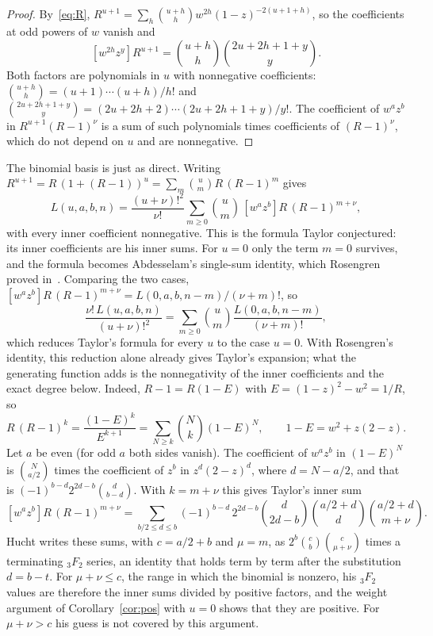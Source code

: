 \documentclass[11pt]{amsart}
\theoremstyle{remark}
\newcommand{\coef}[1]{[#1]}
\begin{document}
\begin{proof}
By~\eqref{eq:R}, $R^{u+1}=\sum_h\binom{u+h}h w^{2h}(1-z)^{-2(u+1+h)}$, so the coefficients at odd powers of $w$ vanish and
\begin{equation}\label{eq:Rpow}
 \coef{w^{2h}z^y}R^{u+1}=\binom{u+h}h\binom{2u+2h+1+y}y.
\end{equation}
Both factors are polynomials in $u$ with nonnegative coefficients: $\binom{u+h}h=(u+1)\cdots(u+h)/h!$ and $\binom{2u+2h+1+y}y=(2u+2h+2)\cdots(2u+2h+1+y)/y!$. The coefficient of $w^az^b$ in $R^{u+1}(R-1)^\nu$ is a sum of such polynomials times coefficients of $(R-1)^\nu$, which do not depend on $u$ and are nonnegative.
\end{proof}

The binomial basis is just as direct. Writing $R^{u+1}=R\,(1+(R-1))^u=\sum_m\binom um R\,(R-1)^m$ gives
\[
 L(u,a,b,n)=\frac{(u+\nu)!^2}{\nu!}\sum_{m\ge0}\binom um\,\coef{w^az^b}R\,(R-1)^{m+\nu},
\]
with every inner coefficient nonnegative. This is the formula Taylor conjectured: its inner coefficients are his inner sums. For $u=0$ only the term $m=0$ survives, and the formula becomes Abdesselam's single-sum identity, which Rosengren proved in~\cite{MO2}. Comparing the two cases, $\coef{w^az^b}R\,(R-1)^{m+\nu}=L(0,a,b,n-m)/(\nu+m)!$, so
\[
 \frac{\nu!\,L(u,a,b,n)}{(u+\nu)!^2}=\sum_{m\ge0}\binom um\frac{L(0,a,b,n-m)}{(\nu+m)!},
\]
which reduces Taylor's formula for every $u$ to the case $u=0$. With Rosengren's identity, this reduction alone already gives Taylor's expansion; what the generating function adds is the nonnegativity of the inner coefficients and the exact degree below. Indeed, $R-1=R(1-E)$ with $E=(1-z)^2-w^2=1/R$, so
\[
 R\,(R-1)^k=\frac{(1-E)^k}{E^{k+1}}=\sum_{N\ge k}\binom Nk(1-E)^N,\qquad 1-E=w^2+z(2-z).
\]
Let $a$ be even (for odd $a$ both sides vanish). The coefficient of $w^az^b$ in $(1-E)^N$ is $\binom N{a/2}$ times the coefficient of $z^b$ in $z^d(2-z)^d$, where $d=N-a/2$, and that is $(-1)^{b-d}2^{2d-b}\binom d{b-d}$. With $k=m+\nu$ this gives Taylor's inner sum
\[
 \coef{w^az^b}R\,(R-1)^{m+\nu}=\sum_{b/2\le d\le b}(-1)^{b-d}\,2^{2d-b}\binom d{2d-b}\binom{a/2+d}d\binom{a/2+d}{m+\nu}.
\]
Hucht writes these sums, with $c=a/2+b$ and $\mu=m$, as $2^b\binom cb\binom c{\mu+\nu}$ times a terminating ${}_3F_2$ series, an identity that holds term by term after the substitution $d=b-t$. For $\mu+\nu\le c$, the range in which the binomial is nonzero, his ${}_3F_2$ values are therefore the inner sums divided by positive factors, and the weight argument of Corollary~\ref{cor:pos} with $u=0$ shows that they are positive. For $\mu+\nu>c$ his guess is not covered by this argument.
\end{document}
